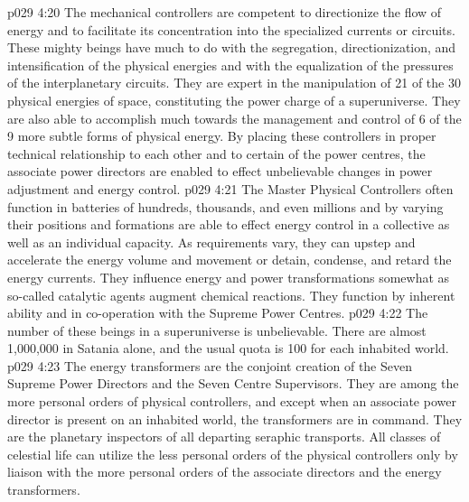 \vs p029 4:20 The mechanical controllers are competent to directionize the flow of energy and to facilitate its concentration into the specialized currents or circuits. These mighty beings have much to do with the segregation, directionization, and intensification of the physical energies and with the equalization of the pressures of the interplanetary circuits. They are expert in the manipulation of 21 of the 30 physical energies of space, constituting the power charge of a superuniverse. They are also able to accomplish much towards the management and control of 6 of the 9 more subtle forms of physical energy. By placing these controllers in proper technical relationship to each other and to certain of the power centres, the associate power directors are enabled to effect unbelievable changes in power adjustment and energy control.
\vs p029 4:21 The Master Physical Controllers often function in batteries of hundreds, thousands, and even millions and by varying their positions and formations are able to effect energy control in a collective as well as an individual capacity. As requirements vary, they can upstep and accelerate the energy volume and movement or detain, condense, and retard the energy currents. They influence energy and power transformations somewhat as so\hyp{}called catalytic agents augment chemical reactions. They function by inherent ability and in co\hyp{}operation with the Supreme Power Centres.
\vs p029 4:22 \bibnobreakspace {} The number of these beings in a superuniverse is unbelievable. There are almost 1,000,000 in Satania alone, and the usual quota is 100 for each inhabited world.
\vs p029 4:23 The energy transformers are the conjoint creation of the Seven Supreme Power Directors and the Seven Centre Supervisors. They are among the more personal orders of physical controllers, and except when an associate power director is present on an inhabited world, the transformers are in command. They are the planetary inspectors of all departing seraphic transports. All classes of celestial life can utilize the less personal orders of the physical controllers only by liaison with the more personal orders of the associate directors and the energy transformers.
